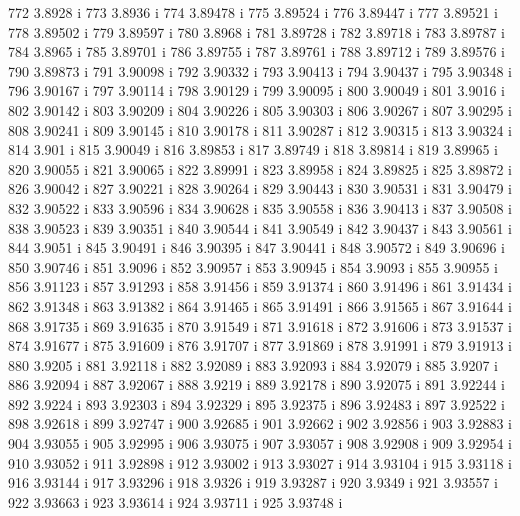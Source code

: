  772  3.8928  i
 773  3.8936  i
 774  3.89478  i
 775  3.89524  i
 776  3.89447  i
 777  3.89521  i
 778  3.89502  i
 779  3.89597  i
 780  3.8968  i
 781  3.89728  i
 782  3.89718  i
 783  3.89787  i
 784  3.8965  i
 785  3.89701  i
 786  3.89755  i
 787  3.89761  i
 788  3.89712  i
 789  3.89576  i
 790  3.89873  i
 791  3.90098  i
 792  3.90332  i
 793  3.90413  i
 794  3.90437  i
 795  3.90348  i
 796  3.90167  i
 797  3.90114  i
 798  3.90129  i
 799  3.90095  i
 800  3.90049  i
 801  3.9016  i
 802  3.90142  i
 803  3.90209  i
 804  3.90226  i
 805  3.90303  i
 806  3.90267  i
 807  3.90295  i
 808  3.90241  i
 809  3.90145  i
 810  3.90178  i
 811  3.90287  i
 812  3.90315  i
 813  3.90324  i
 814  3.901  i
 815  3.90049  i
 816  3.89853  i
 817  3.89749  i
 818  3.89814  i
 819  3.89965  i
 820  3.90055  i
 821  3.90065  i
 822  3.89991  i
 823  3.89958  i
 824  3.89825  i
 825  3.89872  i
 826  3.90042  i
 827  3.90221  i
 828  3.90264  i
 829  3.90443  i
 830  3.90531  i
 831  3.90479  i
 832  3.90522  i
 833  3.90596  i
 834  3.90628  i
 835  3.90558  i
 836  3.90413  i
 837  3.90508  i
 838  3.90523  i
 839  3.90351  i
 840  3.90544  i
 841  3.90549  i
 842  3.90437  i
 843  3.90561  i
 844  3.9051  i
 845  3.90491  i
 846  3.90395  i
 847  3.90441  i
 848  3.90572  i
 849  3.90696  i
 850  3.90746  i
 851  3.9096  i
 852  3.90957  i
 853  3.90945  i
 854  3.9093  i
 855  3.90955  i
 856  3.91123  i
 857  3.91293  i
 858  3.91456  i
 859  3.91374  i
 860  3.91496  i
 861  3.91434  i
 862  3.91348  i
 863  3.91382  i
 864  3.91465  i
 865  3.91491  i
 866  3.91565  i
 867  3.91644  i
 868  3.91735  i
 869  3.91635  i
 870  3.91549  i
 871  3.91618  i
 872  3.91606  i
 873  3.91537  i
 874  3.91677  i
 875  3.91609  i
 876  3.91707  i
 877  3.91869  i
 878  3.91991  i
 879  3.91913  i
 880  3.9205  i
 881  3.92118  i
 882  3.92089  i
 883  3.92093  i
 884  3.92079  i
 885  3.9207  i
 886  3.92094  i
 887  3.92067  i
 888  3.9219  i
 889  3.92178  i
 890  3.92075  i
 891  3.92244  i
 892  3.9224  i
 893  3.92303  i
 894  3.92329  i
 895  3.92375  i
 896  3.92483  i
 897  3.92522  i
 898  3.92618  i
 899  3.92747  i
 900  3.92685  i
 901  3.92662  i
 902  3.92856  i
 903  3.92883  i
 904  3.93055  i
 905  3.92995  i
 906  3.93075  i
 907  3.93057  i
 908  3.92908  i
 909  3.92954  i
 910  3.93052  i
 911  3.92898  i
 912  3.93002  i
 913  3.93027  i
 914  3.93104  i
 915  3.93118  i
 916  3.93144  i
 917  3.93296  i
 918  3.9326  i
 919  3.93287  i
 920  3.9349  i
 921  3.93557  i
 922  3.93663  i
 923  3.93614  i
 924  3.93711  i
 925  3.93748  i
